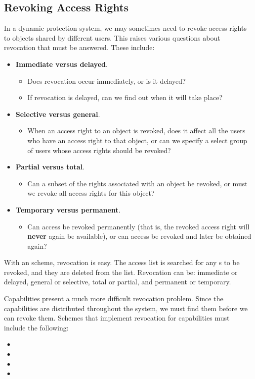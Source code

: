 \subsection{Revoking Access Rights}\label{subsec:Revoking_Access_Rights}
In a dynamic protection system, we may sometimes need to revoke access rights to objects shared by different users.
This raises various questions about revocation that must be answered.
These include:
\begin{itemize}[noitemsep]
\item \textbf{Immediate versus delayed}.
  \begin{itemize}[noitemsep]
  \item Does revocation occur immediately, or is it delayed?
  \item If revocation is delayed, can we find out when it will take place?
  \end{itemize}
\item \textbf{Selective versus general}.
  \begin{itemize}[noitemsep]
  \item When an access right to an object is revoked, does it affect all the users who have an access right to that object, or can we specify a select group of users whose access rights should be revoked?
  \end{itemize}
\item \textbf{Partial versus total}.
  \begin{itemize}[noitemsep]
  \item Can a subset of the rights associated with an object be revoked, or must we revoke all access rights for this object?
  \end{itemize}
\item \textbf{Temporary versus permanent}.
  \begin{itemize}[noitemsep]
  \item Can access be revoked permanently (that is, the revoked access right will \textbf{never} again be available), or can access be revoked and later be obtained again?
  \end{itemize}
\end{itemize}

With an  scheme, revocation is easy.
The access list is searched for any s to be revoked, and they are deleted from the list.
Revocation can be: immediate or delayed, general or selective, total or partial, and permanent or temporary.

Capabilities present a much more difficult revocation problem.
Since the capabilities are distributed throughout the system, we must find them before we can revoke them.
Schemes that implement revocation for capabilities must include the following:
\begin{itemize}[noitemsep]
\item {}
\item {}
\item {}
\item {}
\end{itemize}

